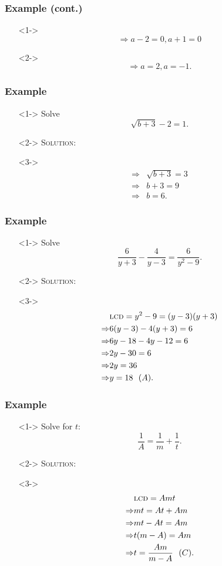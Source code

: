 \documentclass[handout]{beamer}
\begin{document}
\begin{frame}
	\frametitle{Example (cont.)}
	\begin{enumerate}
		\item[]<1-> \[ \Rightarrow a-2=0, a+1=0 \]
		\item[]<2-> \[ \Rightarrow a=2, a=-1. \]
	\end{enumerate}
\end{frame}

\begin{frame}
	\frametitle{Example}
	\begin{enumerate}
		\item[]<1-> Solve
		\[
			\sqrt{b+3}-2=1.
		\]
		\item[]<2-> \textsc{Solution:}
		\item[]<3->
			\begin{align*}
				\Rightarrow & \sqrt{b+3}=3 \\
				\Rightarrow & b+3=9 \\
				\Rightarrow & b=6.
			\end{align*}
	\end{enumerate}
\end{frame}

\begin{frame}
	\frametitle{Example}
	\begin{enumerate}
		\item[]<1-> Solve
		\[
			\frac{6}{y+3}-\frac{4}{y-3}=\frac{6}{y^{2}-9}.
		\]
		\item[]<2-> \textsc{Solution:}
		\item[]<3->
			\begin{align*}
			&\text{\textsc{lcd}}=y^{2}-9=(y-3)(y+3) \\
			\Rightarrow & 6(y-3)-4(y+3)=6 \\
			\Rightarrow & 6y-18-4y-12=6 \\
			\Rightarrow & 2y-30=6 \\
			\Rightarrow & 2y=36 \\
			\Rightarrow & y=18~~(A).
			\end{align*}
	\end{enumerate}
\end{frame}

\begin{frame}
	\frametitle{Example}
	\begin{enumerate}
		\item[]<1-> Solve for $t$:
		\[
			\frac{1}{A}=\frac{1}{m}+\frac{1}{t}.
		\]
		\item[]<2-> \textsc{Solution:}
		\item[]<3->
			\begin{align*}
			&\text{\textsc{lcd}}=Amt \\
			\Rightarrow & mt=At+Am \\
			\Rightarrow & mt-At=Am \\
			\Rightarrow & t(m-A)=Am \\
			\Rightarrow & t=\frac{Am}{m-A}~~(C) .
			\end{align*}
	\end{enumerate}
\end{frame}
\end{document}

